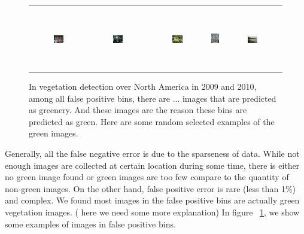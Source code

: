 \documentclass[10pt,journal,compsoc]{IEEEtran}
\begin{document}
\begin{figure}[th]
{{\begin{center}
\begin{tabular}{@{}c@{\,\,\,}c@{\,\,\,}c@{\,\,\,}c@{\,\,\,}c@{\,\,\,}}
\\[-6pt]
\hline
\\[-6pt]
\includegraphics[width=0.19\textwidth]{imggrid/falseposi/16.jpg} &
\includegraphics[width=0.19\textwidth]{imggrid/falseposi/17.jpg} &
\includegraphics[width=0.19\textwidth]{imggrid/falseposi/18.jpg} &
\includegraphics[height=1in]{imggrid/falseposi/19.jpg} &
\includegraphics[width=0.19\textwidth]{imggrid/falseposi/20.jpg} \\
\end{tabular}
\end{center}
}}
\caption{In vegetation detection over North America in 2009 and 2010, among all false positive bins, there are ... images that are predicted as greenery. And these images are the reason these bins are predicted as green. Here are some random selected examples of the green images.}
\label{fig:falseposi}
\end{figure}


Generally, all the false negative error is due to the sparseness of data. While not enough images are collected at certain location during some time, there is either no green image found or green images are too few compare to the quantity of non-green images. On the other hand, false positive error is rare (less than 1\%) and complex. We found most images in the false positive bins are actually green vegetation images. ( here we need some more explanation) In figure ~\ref{fig:falseposi}, we show some examples of images in false positive bins.
\end{document}
